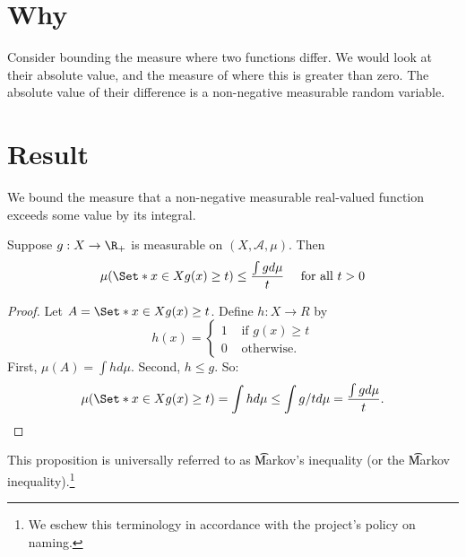 
\section*{Why}

Consider bounding the measure where two functions differ.
We would look at their absolute value, and the measure of where this is greater than zero.
The absolute value of their difference is a non-negative measurable random variable.

\section*{Result}

We bound the measure that a non-negative measurable real-valued function exceeds some value by its integral.

\begin{proposition}
Suppose $g: X \to \R _+$ is measurable on $(X, \mathcal{A} , \mu )$.
Then
\[
\mu (\Set*{x \in X}{g(x) \geq t}) \leq \frac{\int  g d\mu }{t}
\quad
\text{ for all } t > 0
\]
\begin{proof}Let $A = \Set*{x \in X}{g(x) \geq t}$.
Define $h: X \to R$ by
\[
h(x) = \begin{cases}
1 & \text{ if } g(x) \geq t \\
0 & \text{ otherwise. }
\end{cases}
\]
First, $\mu (A) = \int  h d\mu $.
Second, $h \leq g$.
So:
\[
\mu (\Set*{x \in X}{g(x) \geq t})
= \int  h d\mu
\leq \int  g/t d\mu
= \frac{\int  g d\mu }{t}.
\]\end{proof}
\end{proposition}

This proposition is universally referred to as \t{Markov's inequality} (or the \t{Markov inequality}).\footnote{We eschew this terminology in accordance with the project's policy on naming.}

\blankpage